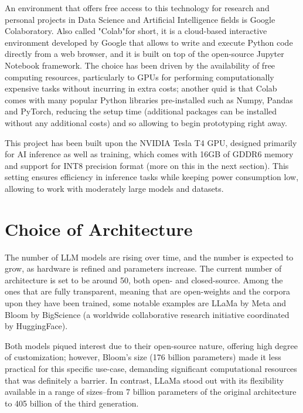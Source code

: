 An environment that offers free access to this technology for research and personal projects in Data Science and Artificial Intelligence fields is Google Colaboratory. \cite{colab2025} Also called "Colab"for short, it is a cloud-based interactive environment developed by Google that allows to write and execute Python code directly from a web browser, and it is built on top of the open-source Jupyter Notebook framework. The choice has been driven by the availability of free computing resources, particularly to GPUs for performing computationally expensive tasks without incurring in extra costs; another quid is that Colab comes with many popular Python libraries pre-installed such as Numpy, Pandas and PyTorch, reducing the setup time (additional packages can be installed without any additional costs) and so allowing to begin prototyping right away.

This project has been built upon the NVIDIA Tesla T4 GPU, designed primarily for AI inference as well as training, which comes with 16GB of GDDR6 memory and support for INT8 precision format (more on this in the next section). This setting ensures efficiency in inference tasks while keeping power consumption low, allowing to work with moderately large models and datasets. \cite{nvidia2025}


\section{Choice of Architecture}
\label{sec:architecture-choice}

The number of LLM models are rising over time, and the number is expected to grow, as hardware is refined and parameters increase. The current number of architecture is set to be around 50, both open- and closed-source. Among the ones that are fully transparent, meaning that are open-weights and the corpora upon they have been trained, some notable examples are LLaMa by Meta \cite{touvron2023llama} and Bloom by BigScience (a worldwide collaborative research initiative coordinated by HuggingFace). \cite{scao2022bloom}

Both models piqued interest due to their open-source nature, offering high degree of customization; however, Bloom's size (176 billion parameters) made it less practical for this specific use-case, demanding significant computational resources that was definitely a barrier. In contrast, LLaMa stood out with its flexibility available in a range of sizes--from 7 billion parameters of the original architecture to 405 billion of the third generation.

